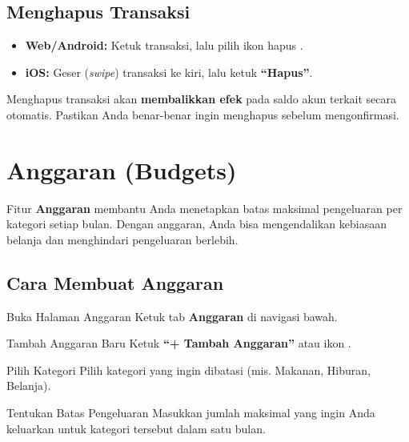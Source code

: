 \documentclass[12pt, a4paper]{article}
\begin{document}
\subsection{Menghapus Transaksi}

\begin{itemize}[leftmargin=1.5em]
  \item \textbf{Web/Android:} Ketuk transaksi, lalu pilih ikon hapus \faTrash.
  \item \textbf{iOS:} Geser (\textit{swipe}) transaksi ke kiri, lalu ketuk \textbf{``Hapus''}.
\end{itemize}

\begin{warnbox}
Menghapus transaksi akan \textbf{membalikkan efek} pada saldo akun terkait secara otomatis. Pastikan Anda benar-benar ingin menghapus sebelum mengonfirmasi.
\end{warnbox}

\section{Anggaran (Budgets)}

Fitur \textbf{Anggaran} membantu Anda menetapkan batas maksimal pengeluaran per kategori setiap bulan. Dengan anggaran, Anda bisa mengendalikan kebiasaan belanja dan menghindari pengeluaran berlebih.

\subsection{Cara Membuat Anggaran}

\begin{stepbox}{Buka Halaman Anggaran}
  Ketuk tab \textbf{Anggaran} di navigasi bawah.
\end{stepbox}

\begin{stepbox}{Tambah Anggaran Baru}
  Ketuk \textbf{``+ Tambah Anggaran''} atau ikon \faPlus.
\end{stepbox}

\begin{stepbox}{Pilih Kategori}
  Pilih kategori yang ingin dibatasi (mis. Makanan, Hiburan, Belanja).
\end{stepbox}

\begin{stepbox}{Tentukan Batas Pengeluaran}
  Masukkan jumlah maksimal yang ingin Anda keluarkan untuk kategori tersebut dalam satu bulan.
\end{stepbox}
\end{document}
